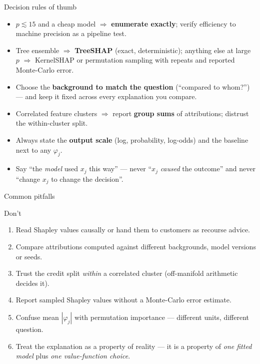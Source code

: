 \documentclass[aspectratio=169,11pt]{beamer}
\begin{document}
\begin{frame}{Decision rules of thumb}
  \begin{itemize}
    \item $p \lesssim 15$ and a cheap model $\Rightarrow$ \textbf{enumerate exactly};
          verify efficiency to machine precision as a pipeline test.
    \item Tree ensemble $\Rightarrow$ \textbf{TreeSHAP} (exact, deterministic);
          anything else at large $p$ $\Rightarrow$ KernelSHAP or permutation
          sampling with repeats and reported Monte-Carlo error.
    \item Choose the \textbf{background to match the question} (``compared to
          whom?'') --- and keep it fixed across every explanation you compare.
    \item Correlated feature clusters $\Rightarrow$ report \textbf{group sums} of
          attributions; distrust the within-cluster split.
    \item Always state the \textbf{output scale} (log, probability, log-odds) and
          the baseline next to any $\varphi_j$.
    \item Say ``the \emph{model} used $x_j$ this way'' --- never ``$x_j$
          \emph{caused} the outcome'' and never ``change $x_j$ to change the
          decision''.
  \end{itemize}
\end{frame}

\begin{frame}{Common pitfalls}
  \begin{alertblock}{Don't}
    \begin{enumerate}
      \item Read Shapley values causally or hand them to customers as recourse
            advice.
      \item Compare attributions computed against different backgrounds, model
            versions or seeds.
      \item Trust the credit split \emph{within} a correlated cluster
            (off-manifold arithmetic decides it).
      \item Report sampled Shapley values without a Monte-Carlo error estimate.
      \item Confuse mean $|\varphi_j|$ with permutation importance --- different
            units, different question.
      \item Treat the explanation as a property of reality --- it is a property of
            \emph{one fitted model} plus \emph{one value-function choice}.
    \end{enumerate}
  \end{alertblock}
\end{frame}
\end{document}
